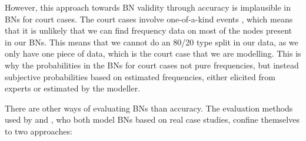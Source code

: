 \documentclass[12pt]{article}
\begin{document}
However, this approach towards BN validity through accuracy is implausible in BNs for court cases. The court cases involve one-of-a-kind events \citep{schum1982}, which means that it is unlikely that we can find frequency data on most of the nodes present in our BNs. This means that we cannot do an 80/20 type split in our data, as we only have one piece of data, which is the court case that we are modelling. This is why the probabilities in the BNs for court cases not pure frequencies, but instead subjective probabilities based on estimated frequencies, either elicited from experts or estimated by the modeller.

There are other ways of evaluating BNs than accuracy. The evaluation methods used by \citet{Fenton2019} and \citet{vlek2016}, who both model BNs based on real case studies, confine themselves to two approaches:
\end{document}
